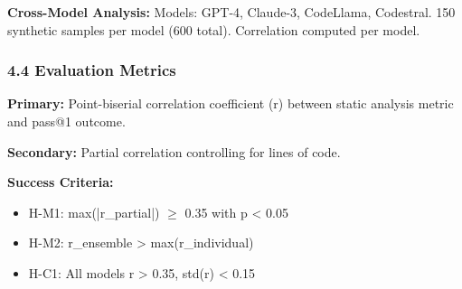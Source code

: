 \textbf{Cross-Model Analysis:} Models: GPT-4, Claude-3, CodeLlama, Codestral. 150 synthetic samples per model (600 total). Correlation computed per model.

\subsubsection{4.4 Evaluation Metrics}

\textbf{Primary:} Point-biserial correlation coefficient (r) between static analysis metric and pass@1 outcome.

\textbf{Secondary:} Partial correlation controlling for lines of code.

\textbf{Success Criteria:}
\begin{itemize}
\item H-M1: max(|r\_partial|) $\geq$ 0.35 with p < 0.05
\item H-M2: r\_ensemble > max(r\_individual)
\item H-C1: All models r > 0.35, std(r) < 0.15
\end{itemize}
